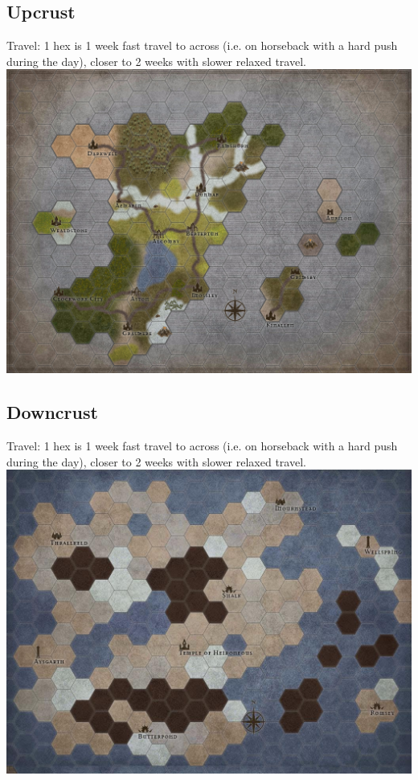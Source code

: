 \documentclass[10pt,twoside,twocolumn]{article}
\begin{document}
\subsection{Upcrust}

Travel: 1 hex is 1 week fast travel to across (i.e. on horseback with a hard push during the day), closer to 2 weeks with slower relaxed travel. \\

\includegraphics[width=\textwidth]{Images/Maps/Upcrust}

\clearpage

\subsection{Downcrust}

Travel: 1 hex is 1 week fast travel to across (i.e. on horseback with a hard push during the day), closer to 2 weeks with slower relaxed travel. \\

\includegraphics[width=\textwidth]{Images/Maps/Downcrust}
\end{document}
